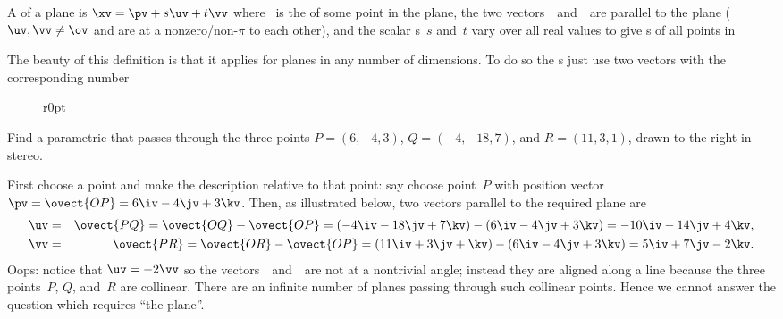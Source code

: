 \begin{definition} \label{def:parpla}
A  of a plane is \(\xv=\pv+s\uv+t\vv\) where \pv~is the  of some point in the plane,   the two vectors~\uv\ and~\vv\ are parallel to the plane (\(\uv,\vv\neq\ov\) and are at a nonzero\slash non-\(\pi\)  to each other), and the scalar s~\(s\) and~\(t\) vary over all real values to give s of all points in 
\end{definition}

The beauty of this definition is that it applies for planes in any number of dimensions.
To do so the s just use two vectors with the corresponding number 

\begin{wrapfigure}[8]r{0pt}
 {}
\end{wrapfigure}
\begin{example} 
Find a parametric  that passes through the three points \(P=(6,-4,3)\), \(Q=(-4,-18,7)\), and \(R=(11,3,1)\), drawn to the right in stereo.

\begin{solution} 
First choose a point and make the description relative to that point: say choose point~\(P\) with position vector \(\pv=\ovect{OP}=6\iv-4\jv+3\kv\).
Then, as illustrated below, two vectors parallel to the required plane are 
\begin{eqnarray*}
\uv&=&\ovect{PQ} =\ovect{OQ}-\ovect{OP} 
=(-4\iv-18\jv+7\kv)-(6\iv-4\jv+3\kv) 
=-10\iv-14\jv+4\kv,
\\\vv&=&\ovect{PR} =\ovect{OR}-\ovect{OP} 
=(11\iv+3\jv+\kv)-(6\iv-4\jv+3\kv) 
=5\iv+7\jv-2\kv.
\end{eqnarray*}
Oops: notice that \(\uv=-2\vv\) so the vectors~\uv\ and~\vv\ are not at a nontrivial angle; instead they are aligned along a line because the three points~\(P\), \(Q\), and~\(R\) are collinear.
There are an infinite number of planes passing through such collinear  points.
Hence we cannot answer the question which requires ``the plane''.
\end{solution}
\end{example}



